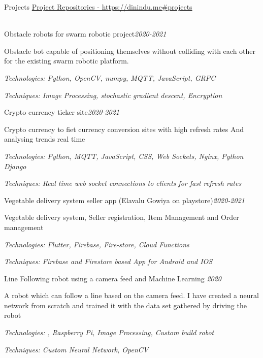 \documentclass{resume} %
\begin{document}
\clearpage

\begin{rSection}{Projects}
\href{https://dinindu.me#projects}{Project Repositories - https://dinindu.me\#projects} \\ \\
\begin{rSubsection}{Obstacle robots for swarm robotic project}{\em {2020-2021}}{}{}
\item Obstacle bot capable of positioning themselves without colliding with each other for the existing swarm robotic platform. \item 
\textit{Technologies: Python, OpenCV, numpy, MQTT, JavaScript, GRPC}
\item \textit{Techniques: Image Processing, stochastic gradient descent, Encryption }
\end{rSubsection}

\begin{rSubsection}{Crypto currency ticker site}{\em {2020-2021}}{}{}
\item Crypto currency to fiet currency conversion sites with high refresh rates And analysing trends real time \item 
\textit{Technologies: Python, MQTT, JavaScript, CSS, Web Sockets, Nginx, Python Django}
\item \textit{Techniques: Real time web socket connections to clients for fast refresh rates}
\end{rSubsection}

\begin{rSubsection}{Vegetable delivery system seller app (Elavalu Gowiya on playstore)}{\em {2020-2021}}{}{}
\item Vegetable delivery system, Seller registration, Item Management and Order management \item 
\textit{Technologies: Flutter, Firebase, Fire-store, Cloud Functions}
\item \textit{Techniques: Firebase and Firestore based App for Android and IOS}
\end{rSubsection}

\begin{rSubsection}{Line Following robot using a camera feed and Machine Learning }{\em {2020}}{}{}
\item A robot which can follow a line based on the camera feed. I have created a neural network from scratch and trained it with the data set gathered by driving the robot \item 
\textit{Technologies: , Raspberry Pi, Image Processing, Custom build robot}
\item \textit{Techniques: Custom Neural Network, OpenCV }
\end{rSubsection}


\end{rSection}
\end{document}
